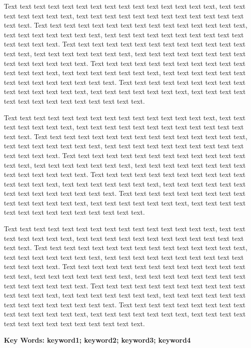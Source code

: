 Text text text text text text text text text text text text text text text, text text text text text text text, text text text text text text text text text text text text text text. Text text text text text text text text text text text text text text text, text text text text text text text, text text text text text text text text text text text text text text. Text text text text text text text text text text text text text text text, text text text text text text text, text text text text text text text text text text text text text text. Text text text text text text text text text text text text text text text, text text text text text text text, text text text text text text text text text text text text text text. Text text text text text text text text text text text text text text text, text text text text text text text, text text text text text text text text text text text text text text.

Text text text text text text text text text text text text text text text, text text text text text text text, text text text text text text text text text text text text text text. Text text text text text text text text text text text text text text text, text text text text text text text, text text text text text text text text text text text text text text. Text text text text text text text text text text text text text text text, text text text text text text text, text text text text text text text text text text text text text text. Text text text text text text text text text text text text text text text, text text text text text text text, text text text text text text text text text text text text text text. Text text text text text text text text text text text text text text text, text text text text text text text, text text text text text text text text text text text text text text.

Text text text text text text text text text text text text text text text, text text text text text text text, text text text text text text text text text text text text text text. Text text text text text text text text text text text text text text text, text text text text text text text, text text text text text text text text text text text text text text. Text text text text text text text text text text text text text text text, text text text text text text text, text text text text text text text text text text text text text text. Text text text text text text text text text text text text text text text, text text text text text text text, text text text text text text text text text text text text text text. Text text text text text text text text text text text text text text text, text text text text text text text, text text text text text text text text text text text text text text.




\vspace*{1.0\baselineskip}
\noindent
{\fontsize{12pt}{12pt}\selectfont \textbf{Key Words: keyword1; keyword2; keyword3; keyword4}} %




\clearpage									%
